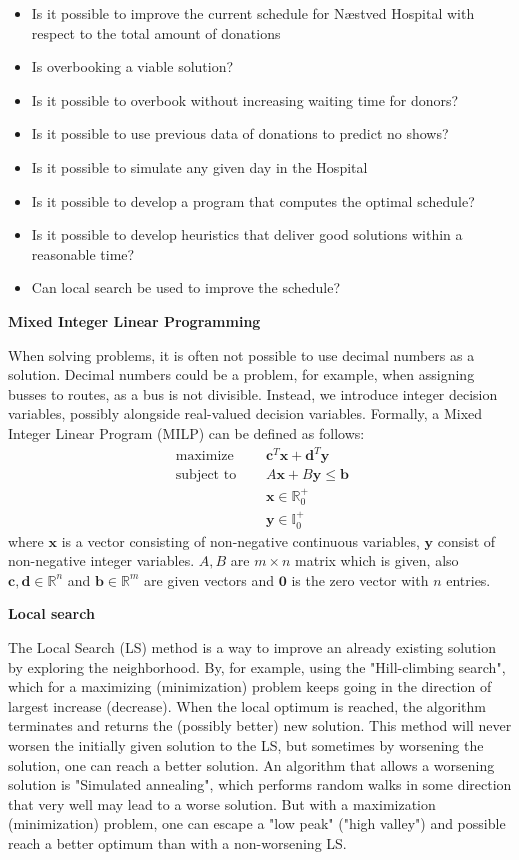 \documentclass[a4paper,12pt]{article}
\begin{document}
\begin{itemize}
    \item Is it possible to improve the current schedule for Næstved Hospital with respect to the total amount of donations
    \item Is overbooking a viable solution?
    \item Is it possible to overbook without increasing waiting time for donors?
    \item Is it possible to use previous data of donations to predict no shows?
    \item Is it possible to simulate any given day in the Hospital
    \item Is it possible to develop a program that computes the optimal schedule?
    \item Is it possible to develop heuristics that deliver good solutions within a reasonable time?
    \item Can local search be used to improve the schedule?
\end{itemize}

\textbf{Mixed Integer Linear Programming}

When solving problems, it is often not possible to use decimal numbers as a solution. Decimal numbers could be a problem, for example, when assigning busses to routes, as a bus is not divisible. Instead, we introduce integer decision variables, possibly alongside real-valued decision variables. Formally, a Mixed Integer Linear Program (MILP) can be defined as follows:
$$
\begin{aligned} 
    \text { maximize } & \quad \mathbf{c}^{T} \mathbf{x} + \mathbf{d}^{T} \mathbf{y} \\
    \text { subject to } & \quad A \mathbf{x} + B \mathbf{y} \leq \mathbf{b} \\
    & \quad \mathbf{x} \in \mathbb{R}_{0}^{+} \\
    & \quad \mathbf{y} \in \mathbb{I}_{0}^{+}
\end{aligned}
$$
where $\mathbf{x}$ is a vector consisting of non-negative continuous variables, $\mathbf{y}$ consist of non-negative integer variables. $A, B$ are $m \times n$ matrix which is given, also $\mathbf{c}, \mathbf{d} \in \mathbb{R}^n$ and $\mathbf{b} \in \mathbb{R}^m$ are given vectors and $\mathbf{0}$ is the zero vector with $n$ entries.

\bigbreak
\textbf{Local search}

The Local Search (LS) method is a way to improve an already existing solution by exploring the neighborhood. By, for example, using the "Hill-climbing search", which for a maximizing (minimization) problem keeps going in the direction of largest increase (decrease). When the local optimum is reached, the algorithm terminates and returns the (possibly better) new solution. This method will never worsen the initially given solution to the LS, but sometimes by worsening the solution, one can reach a better solution. An algorithm that allows a worsening solution is "Simulated annealing", which performs random walks in some direction that very well may lead to a worse solution. But with a maximization (minimization) problem, one can escape a "low peak" ("high valley") and possible reach a better optimum than with a non-worsening LS.
\end{document}
